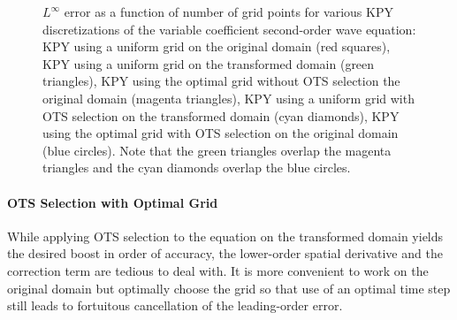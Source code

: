 \documentclass[twocolumn]{article} %
\begin{document}
\begin{figure}[thb]
\begin{center}
\caption{$L^\infty$ error as a function of number of grid points for various
KPY discretizations of the variable coefficient second-order wave equation:
KPY using a uniform grid on the original domain (red squares),
KPY using a uniform grid on the transformed domain (green triangles),
KPY using the optimal grid without OTS selection the original domain 
(magenta triangles),
KPY using a uniform grid with OTS selection on the transformed domain 
(cyan diamonds),
KPY using the optimal grid with OTS selection on the original domain 
(blue circles).  Note that the green triangles overlap the magenta triangles 
and the cyan diamonds overlap the blue circles. 
}
\label{fig:var_coef_wave_eqn_1d_error}
\end{center}
\end{figure}

\paragraph*{OTS Selection with Optimal Grid}
While applying OTS selection to the equation on the transformed domain yields the 
desired boost in order of accuracy, the lower-order spatial derivative and 
the correction term are tedious to deal with.  It is more convenient to 
work on the original domain but optimally choose the grid so that use of
an optimal time step still leads to fortuitous cancellation of the 
leading-order error.  
\end{document}
